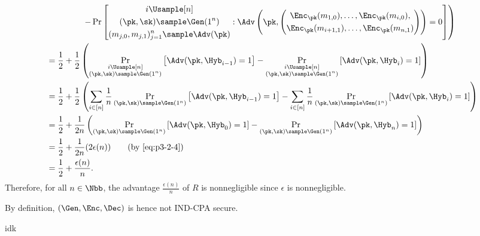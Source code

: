 \begin{answer}[ii]
\begin{align*}
        &\qquad\qquad\; \left.- \Pr\left[\begin{gathered}
            i\Usample [n]\\
            (\pk, \sk)\sample\Gen(1^n)\\
            (m_{j,0},m_{j,1})_{j=1}^n \sample \Adv(\pk)
        \end{gathered}: \Adv\left(\pk, \left(\begin{gathered}\Enc_\pk(m_{1,0}),\ldots, \Enc_\pk(m_{i,0}), \\\Enc_\pk(m_{i+1,1}),\ldots, \Enc_\pk(m_{n,1})\end{gathered}\right)\right)=0 \right]
        \right)\\
        &= \frac{1}{2}+\frac{1}{2}\left(\Pr_{ \substack{i\Usample [n]\\(\pk, \sk)\sample\Gen(1^n)}}\left[  \Adv(\pk, \Hyb_{i-1})=1\right] - \Pr_{ \substack{i\Usample [n]\\(\pk, \sk)\sample\Gen(1^n)}}\left[  \Adv(\pk, \Hyb_{i})=1\right]\right)\\
        &= \frac{1}{2}+\frac{1}{2}\left(\sum_{i\in [n]}\frac{1}{n}\Pr_{(\pk, \sk)\sample\Gen(1^n)}\left[  \Adv(\pk, \Hyb_{i-1})=1\right] - \sum_{i\in [n]}\frac{1}{n}\Pr_{(\pk, \sk)\sample\Gen(1^n)}\left[  \Adv(\pk, \Hyb_{i})=1\right]\right)\\
        &= \frac{1}{2}+\frac{1}{2n}\left(\Pr_{(\pk, \sk)\sample\Gen(1^n)}\left[  \Adv(\pk, \Hyb_{0})=1\right]-\Pr_{(\pk, \sk)\sample\Gen(1^n)}\left[  \Adv(\pk, \Hyb_{n})=1\right]\right)\\
        &= \frac{1}{2}+\frac{1}{2n} (2\epsilon(n)) \qquad (\textrm{by \eqref{eq:p3-2-4}})\\
        &= \frac{1}{2}+\frac{\epsilon(n)}{n}.
    \end{align*}
    Therefore, for all $n\in\Nbb$, the advantage $\frac{\epsilon(n)}{n}$ of $R$ is nonnegligible since $\epsilon$ is nonnegligible. 
    
    By definition,  $(\Gen, \Enc, \Dec)$ is hence not IND-CPA secure.
\end{answer}



\begin{answer}[iii]
    idk
\end{answer}




